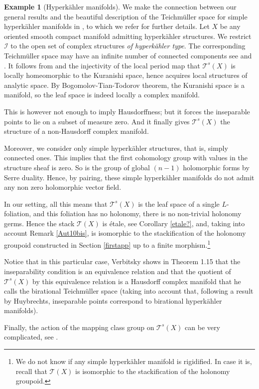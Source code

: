 \documentclass[10pt]{amsart}
\let\mathcal\mathscr
\theoremstyle{plain}
\theoremstyle{definition}
\newtheorem{example}[theorem]{Example}
\theoremstyle{remark}
\numberwithin{equation}{section}
\newcommand{\cI}{\mathcal{I}}
\begin{document}
\begin{example}[Hyperkähler manifolds]
\label{HK}
We make the connection between our general results and the beautiful description of the Teichmüller space for simple hyperkähler manifolds in \cite{Verbitsky}, to which we refer for further details. Let $X$ be any oriented smooth compact manifold admitting hyperkähler structures. We restrict $\cI$ to the open set of complex structures \emph{of hyperkähler type}. The corresponding Teichmüller space may have an infinite number of connected components see \cite{KS} and \cite{VerbitskyCorrige}. It follows from \cite[Prop.\,15]{Catsurvey} and the injectivity of the local period map that $\mathcal T^s(X)$ is locally homeomorphic to the Kuranishi space, hence acquires local structures of analytic space. By Bogomolov-Tian-Todorov theorem, the Kuranishi space is a manifold, so the leaf space is indeed locally a complex manifold.

This is however not enough to imply Hausdorffness; but it forces the inseparable points to lie on a subset of measure zero. And it finally gives $\mathcal T^s(X)$ the structure of a non-Hausdorff complex manifold.

Moreover, we consider only simple hyperkähler structures, that is, simply connected ones. This implies that the first cohomology group with values in the structure sheaf is zero. So is the group of global $(n-1)$ holomorphic forms by Serre duality. Hence, by pairing, these simple hyperkähler manifolds do not admit any non zero holomorphic vector field.

In our setting, all this means that
$\mathcal T^s(X)$ is the leaf space of a single $L$-foliation, and this foliation has no holonomy, \ie there is no non-trivial holonomy germs. Hence the stack $\mathcal T(X)$ is étale, see Corollary \ref{etale?}, and, taking into account Remark \ref{Aut10bis}, is isomorphic to the stackification of the holonomy groupoid constructed in Section \ref{firstapp} up to a finite morphism.\footnote{We do not know if any simple hyperkähler manifold is rigidified. In case it is, recall that $\mathcal T(X)$ is isomorphic to the stackification of the holonomy groupoid.}

Notice that in this particular case, Verbitsky shows in Theorem 1.15 that the inseparability condition is an equivalence relation and that the quotient of $\mathcal T^s(X)$ by this equivalence relation is a Hausdorff complex manifold that he calls the birational Teichmüller space (taking into account that, following a result by Huybrechts, inseparable points correspond to birational hyperkähler manifolds).

Finally, the action of the mapping class group on $\mathcal T^s(X)$ can be very complicated, see \cite{VerbitskyErgodic}.
\end{example}
\end{document}
